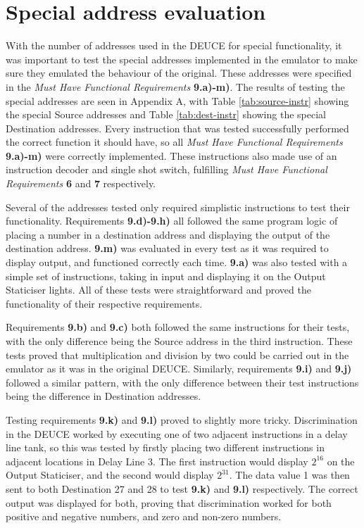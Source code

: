 \documentclass{l4proj}
\begin{document}
\section{Special address evaluation}
With the number of addresses used in the DEUCE for special functionality, it was important to test the special addresses implemented in the emulator to make sure they emulated the behaviour of the original. These addresses were specified in the \textit{Must Have Functional Requirements} \textbf{9.a)-m)}. The results of testing the special addresses are seen in Appendix A, with Table \ref{tab:source-instr} showing the special Source addresses and Table \ref{tab:dest-instr} showing the special Destination addresses. Every instruction that was tested successfully performed the correct function it should have, so all \textit{Must Have Functional Requirements} \textbf{9.a)-m)} were correctly implemented. These instructions also made use of an instruction decoder and single shot switch, fulfilling \textit{Must Have Functional Requirements} \textbf{6} and \textbf{7} respectively.

Several of the addresses tested only required simplistic instructions to test their functionality. Requirements \textbf{9.d)-9.h)} all followed the same program logic of placing a number in a destination address and displaying the output of the destination address. \textbf{9.m)} was evaluated in every test as it was required to display output, and functioned correctly each time. \textbf{9.a)} was also tested with a simple set of instructions, taking in input and displaying it on the Output Staticiser lights. All of these tests were straightforward and proved the functionality of their respective requirements.

Requirements \textbf{9.b)} and \textbf{9.c)} both followed the same instructions for their tests, with the only difference being the Source address in the third instruction. These tests proved that multiplication and division by two could be carried out in the emulator as it was in the original DEUCE. Similarly, requirements \textbf{9.i)} and \textbf{9.j)} followed a similar pattern, with the only difference between their test instructions being the difference in Destination addresses.

Testing requirements \textbf{9.k)} and \textbf{9.l)} proved to slightly more tricky. Discrimination in the DEUCE worked by executing one of two adjacent instructions in a delay line tank, so this was tested by firstly placing two different instructions in adjacent locations in Delay Line 3. The first instruction would display $ 2^{16} $ on the Output Staticiser, and the second would display $ 2^{31} $. The data value 1 was then sent to both Destination 27 and 28 to test \textbf{9.k)} and \textbf{9.l)} respectively. The correct output was displayed for both, proving that discrimination worked for both positive and negative numbers, and zero and non-zero numbers.
\end{document}
